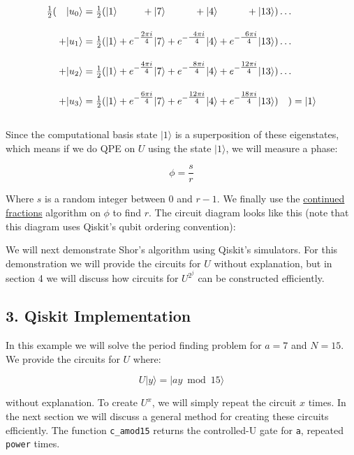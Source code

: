\documentclass[11pt]{article}
\begin{document}
\[\begin{aligned}
\tfrac{1}{2}(\quad|u_0\rangle &= \tfrac{1}{2}(|1\rangle \hphantom{e^{-\tfrac{2\pi i}{12}}}+ |7\rangle \hphantom{e^{-\tfrac{12\pi i}{12}}} + |4\rangle \hphantom{e^{-\tfrac{12\pi i}{12}}} + |13\rangle)\dots \\[10pt]
+ |u_1\rangle &= \tfrac{1}{2}(|1\rangle + e^{-\tfrac{2\pi i}{4}}|7\rangle + e^{-\tfrac{\hphantom{1}4\pi i}{4}}|4\rangle + e^{-\tfrac{\hphantom{1}6\pi i}{4}}|13\rangle)\dots \\[10pt]
+ |u_2\rangle &= \tfrac{1}{2}(|1\rangle + e^{-\tfrac{4\pi i}{4}}|7\rangle + e^{-\tfrac{\hphantom{1}8\pi i}{4}}|4\rangle + e^{-\tfrac{12\pi i}{4}}|13\rangle)\dots \\[10pt]
+ |u_3\rangle &= \tfrac{1}{2}(|1\rangle + e^{-\tfrac{6\pi i}{4}}|7\rangle + e^{-\tfrac{12\pi i}{4}}|4\rangle + e^{-\tfrac{18\pi i}{4}}|13\rangle)\quad) = |1\rangle \\[10pt]
\end{aligned}\]

Since the computational basis state \(|1\rangle\) is a superposition of
these eigenstates, which means if we do QPE on \(U\) using the state
\(|1\rangle\), we will measure a phase:

\[\phi = \frac{s}{r}\]

Where \(s\) is a random integer between \(0\) and \(r-1\). We finally
use the
\href{https://en.wikipedia.org/wiki/Continued_fraction}{continued
fractions} algorithm on \(\phi\) to find \(r\). The circuit diagram
looks like this (note that this diagram uses Qiskit's qubit ordering
convention):

We will next demonstrate Shor's algorithm using Qiskit's simulators. For
this demonstration we will provide the circuits for \(U\) without
explanation, but in section 4 we will discuss how circuits for
\(U^{2^j}\) can be constructed efficiently.

    \subsection{3. Qiskit Implementation}\label{qiskit-implementation}

In this example we will solve the period finding problem for \(a=7\) and
\(N=15\). We provide the circuits for \(U\) where:

\[U|y\rangle = |ay\bmod 15\rangle \]

without explanation. To create \(U^x\), we will simply repeat the
circuit \(x\) times. In the next section we will discuss a general
method for creating these circuits efficiently. The function
\texttt{c\_amod15} returns the controlled-U gate for \texttt{a},
repeated \texttt{power} times.
\end{document}
